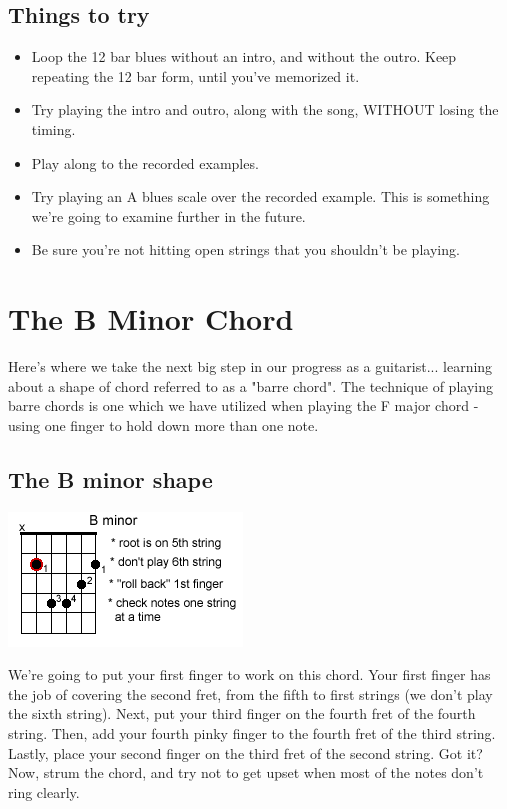 \subsection{Things to try}
\begin{itemize}
\item Loop the 12 bar blues without an intro, and without the outro. Keep repeating the 12 bar form, until you've memorized it.
\item Try playing the intro and outro, along with the song, WITHOUT losing the timing.
\item Play along to the recorded examples.
\item Try playing an A blues scale over the recorded example. This is something we're going to examine further in the future.
\item Be sure you're not hitting open strings that you shouldn't be playing. 
\end{itemize}

\section{The B Minor Chord}
Here's where we take the next big step in our progress as a guitarist... learning about a shape of chord referred to as a "barre chord". The technique of playing barre chords is one which we have utilized when playing the F major chord - using one finger to hold down more than one note.

\subsection{The B minor shape}
\includegraphics{partfive/bminor.png}

We're going to put your first finger to work on this chord. Your first finger has the job of covering the second fret, from the fifth to first strings (we don't play the sixth string). Next, put your third finger on the fourth fret of the fourth string. Then, add your fourth pinky finger to the fourth fret of the third string. Lastly, place your second finger on the third fret of the second string. Got it? Now, strum the chord, and try not to get upset when most of the notes don't ring clearly.

